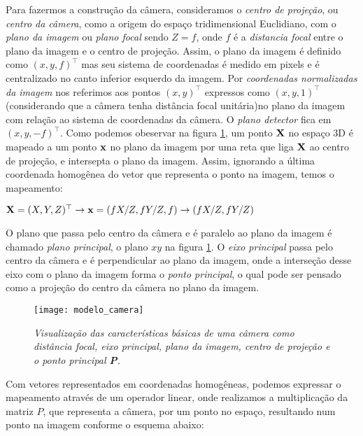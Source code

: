 Para fazermos a construção da câmera, consideramos o \textit{centro de projeção}, ou \textit{centro da câmera}, como a origem do espaço tridimensional Euclidiano, com o \textit{plano da imagem} ou \textit{plano focal} sendo $Z = f$, onde $f$ é a \textit{distancia focal} entre o plano da imagem e o centro de projeção. Assim, o plano da imagem é definido como $(x,y,f)^\top$ mas seu sistema de coordenadas é medido em pixels e é centralizado no canto inferior esquerdo da imagem. Por \textit{coordenadas normalizadas da imagem} nos referimos aos pontos $(x,y)^\top$ expressos como $(x,y,1)^\top$ (considerando que a câmera tenha distância focal unitária)no plano da imagem com relação ao sistema de coordenadas da câmera. O \textit{plano detector} fica em $(x,y,-f)^\top$. Como podemos obeservar na figura \ref{camera}, um ponto $\mathbf{X}$ no espaço 3D é mapeado a um ponto $\mathbf{x}$ no plano da imagem por uma reta que liga $\mathbf{X}$ ao centro de projeção, e intersepta o plano da imagem. Assim, ignorando a última coordenada homogênea do vetor que representa o ponto na imagem, temos o mapeamento:

\begin{center}
$\mathbf{X} = (X,Y,Z)^\top \rightarrow \mathbf{x} = (fX/Z,fY/Z,f) \rightarrow (fX/Z,fY/Z)$  
\end{center}

O plano que passa pelo centro da câmera e é paralelo ao plano da imagem é chamado \textit{plano principal}, o plano $xy$ na figura \ref{camera}. O \textit{eixo principal} passa pelo centro da câmera e é perpendicular ao plano da imagem, onde a interseção desse eixo com o plano da imagem forma o \textit{ponto principal}, o qual pode ser pensado como a projeção do centro da câmera no plano da imagem.


\begin{figure}[!htb]
\centering
\texttt{[image: modelo\_camera]}
\caption{\textit{Visualização das características básicas de uma câmera como distância focal, eixo principal, plano da imagem, centro de projeção e o ponto principal {\bf P}.}}
\label{camera}
\end{figure}

Com vetores representados em coordenadas homogêneas, podemos expressar o mapeamento através de um operador linear, onde realizamos a multiplicação da matriz $P$, que representa a câmera, por um ponto no espaço, resultando num ponto na imagem conforme o esquema abaixo:

